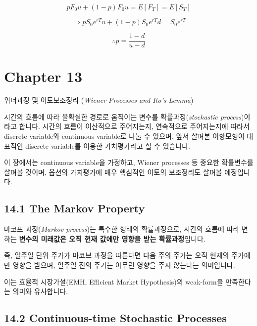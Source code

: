 \documentclass[
  letterpaper,
  DIV=11,
  numbers=noendperiod]{scrreprt}
\begin{document}
\[pF_0u+(1-p)F_0u=E[F_T]=E[S_T]\]

\[\Rightarrow pS_0e^{rT}u+(1-p)S_0e^{rT}d=S_0e^{rT}\]

\[\therefore p=\frac{1-d}{u-d}\]


\chapter*{Chapter 13}\label{chapter-13-1}


위너과정 및 이토보조정리 (\emph{Wiener Processes and Ito's Lemma})

시간의 흐름에 따라 불확실한 경로로 움직이는 변수를
확률과정(\emph{stochastic process})이라고 합니다. 시간의 흐름이
이산적으로 주어지는지, 연속적으로 주어지는지에 따라서 discrete
variable와 continuous variable로 나눌 수 있으며, 앞서 살펴본 이항모형이
대표적인 discrete variable를 이용한 가치평가라고 할 수 있습니다.

이 장에서는 continuous variable을 가정하고, Wiener processes 등 중요한
확률변수를 살펴볼 것이며, 옵션의 가치평가에 매우 핵심적인 이토의
보조정리도 살펴볼 예정입니다.

\section*{14.1 The Markov Property}\label{the-markov-property}


마코프 과정(\emph{Markov process})는 특수한 형태의 확률과정으로, 시간의
흐름에 따라 변하는 \textbf{변수의 미래값은 오직 현재 값에만 영향을 받는
확률과정}입니다.

즉, 일주일 단위 주가가 마코브 과정을 따른다면 다음 주의 주가는 오직
현재의 주가에만 영향을 받으며, 일주일 전의 주가는 아무런 영향을 주지
않는다는 의미입니다.

이는 효율적 시장가설(EMH, Efficient Market Hypothesis)의 weak-form을
만족한다는 의미와 유사합니다.

\section*{14.2 Continuous-time Stochastic
Processes}\label{continuous-time-stochastic-processes}
\end{document}
